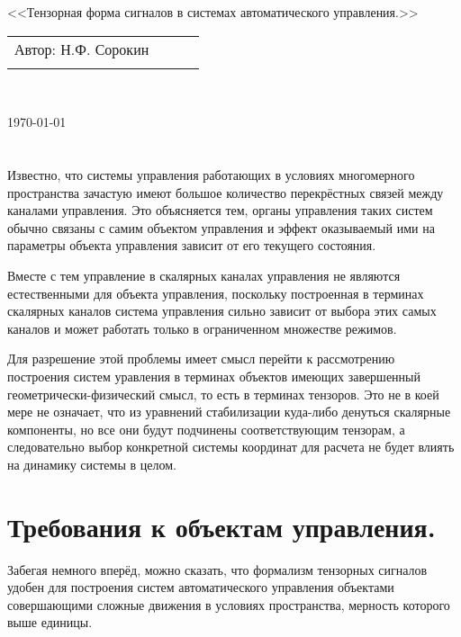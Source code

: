 \documentclass[a4paper]{article}
\begin{document}
\begin{center}
\hfill \break
\hfill\break
\hfill \break
\hfill \break
\hfill \break
\hfill \break
\hfill \break
\hfill \break
\hfill \break
\hfill \break
\large{<<Тензорная форма сигналов в системах автоматического управления.>>}\\
\hfill \break
\hfill \break
\hfill \break
\hfill \break
\hfill \break
\hfill \break
\hfill \break
\hfill \break
\end{center}
 
\normalsize{ 
\begin{tabular}{lccl}
Автор: Н.Ф. Сорокин\\\\
\end{tabular}
}\\
\hfill \break
\hfill \break
\hfill \break
\hfill \break
\hfill \break
\begin{center} \today \end{center}
\thispagestyle{empty} %
\newpage

\section{}

Известно, что системы управления работающих в условиях многомерного пространства зачастую имеют большое количество перекрёстных связей между каналами управления. Это объясняется тем, органы управления таких систем обычно связаны с самим объектом управления и эффект оказываемый ими на параметры объекта управления зависит от его текущего состояния.

Вместе с тем управление в скалярных каналах управления не являются естественными для объекта управления, поскольку построенная в терминах скалярных каналов система управления сильно зависит от выбора этих самых каналов и может работать только в ограниченном множестве режимов.

Для разрешение этой проблемы имеет смысл перейти к рассмотрению построения систем уравления в терминах объектов имеющих завершенный геометрически-физический смысл, то есть в терминах тензоров. Это не в коей мере не означает, что из уравнений стабилизации куда-либо денуться скалярные компоненты, но все они будут подчинены соответствующим тензорам, а следовательно выбор конкретной системы координат для расчета не будет влиять на динамику системы в целом.

\section{Требования к объектам управления.}
Забегая немного вперёд, можно сказать, что формализм тензорных сигналов удобен для построения систем автоматического управления объектами совершающими сложные движения в условиях пространства, мерность которого выше единицы.
\end{document}
